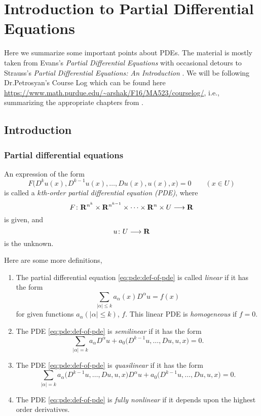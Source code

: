 \chapter{Introduction to Partial Differential Equations}
Here we summarize some important points about PDEs. The material is mostly
taken from Evans's \emph{Partial Differential Equations} \cite{evans} with
occasional detours to Strauss's \emph{Partial Differential Equations: An
  Introduction} \cite{strauss}. We will be following Dr.\@ Petrosyan's
\textsf{Course Log} which can be found here
\url{https://www.math.purdue.edu/~arshak/F16/MA523/courselog/}, i.e.,
summarizing the appropriate chapters from \cite{evans}.

\section{Introduction}
\subsection{Partial differential equations}
\begin{definition}
  An expression of the form
  \begin{equation}
    \label{eq:pde:def-of-pde}
    F\bigl(D^ku(x),D^{k-1}u(x),\dotsc,Du(x),u(x),x\bigr)=0
    \qquad (x\in U)
  \end{equation}
  is called a \emph{\(k\)th-order partial differential equation (PDE)},
  where
  \[
    F\colon\mathbf{R}^{n^k}\times\mathbf{R}^{n^{k-1}}\times\dotsb\times\mathbf{R}^n\times U\longrightarrow\mathbf{R}
  \]
  is given, and
  \[
    u\colon U\longrightarrow\mathbf{R}
  \]
  is the unknown.
\end{definition}

Here are some more definitions,
\begin{definition}
  \hfill
  \begin{enumerate}[label=(\roman*)]
  \item The partial differential equation \eqref{eq:pde:def-of-pde} is
    called \emph{linear} if it has the form
    \[
      \sum_{|\alpha|\leq k}a_\alpha(x)D^\alpha u=f(x)
    \]
    for given functions \(a_\alpha(|\alpha|\leq k)\), \(f\). This linear
    PDE is \emph{homogeneous} if \(f=0\).
  \item The PDE \eqref{eq:pde:def-of-pde} is \emph{semilinear} if it has
    the form
    \[
      \sum_{|\alpha|=k}a_\alpha D^\alpha u
      +a_0\bigl(D^{k-1}u,\dotsc,Du,u,x\bigr)=0.
    \]
  \item The PDE \eqref{eq:pde:def-of-pde} is \emph{quasilinear} if it has
    the form
    \[
      \sum_{|\alpha|=k}a_\alpha\bigl(D^{k-1}u,\dotsc,Du,u,x\bigr)D^\alpha u
      +a_0\bigl(D^{k-1}u,\dotsc,Du,u,x\bigr)=0.
    \]
  \item The PDE \eqref{eq:pde:def-of-pde} is \emph{fully nonlinear} if it
    depends upon the highest order derivatives.
  \end{enumerate}
\end{definition}

